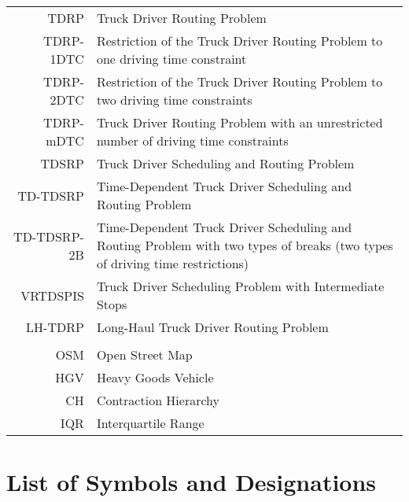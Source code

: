 \begin{tabular}{rp{}}
	TDRP        & Truck Driver Routing Problem                                                                                                 \\
	TDRP-1DTC   & Restriction of the Truck Driver Routing Problem to one driving time constraint                                               \\
	TDRP-2DTC   & Restriction of the Truck Driver Routing Problem to two driving time constraints                                              \\
	TDRP-mDTC   & Truck Driver Routing Problem with an unrestricted number of driving time constraints                                         \\
	TDSRP       & Truck Driver Scheduling and Routing Problem                                                                                  \\
	TD-TDSRP    & Time-Dependent Truck Driver Scheduling and Routing Problem                                                                   \\
	TD-TDSRP-2B & Time-Dependent Truck Driver Scheduling and Routing Problem with two types of breaks (two types of driving time restrictions) \\
	VRTDSPIS    & Truck Driver Scheduling Problem with Intermediate Stops                                                                      \\
	LH-TDRP     & Long-Haul Truck Driver Routing Problem                                                                                       \\
	\vspace{2\baselineskip}                                                                                                                    \\
	OSM         & Open Street Map                                                                                                              \\
	HGV         & Heavy Goods Vehicle                                                                                                              \\
	CH          & Contraction Hierarchy                                                                                                        \\
	IQR         & Interquartile Range
\end{tabular}



\section{List of Symbols and Designations}
\label{app:symbols}

